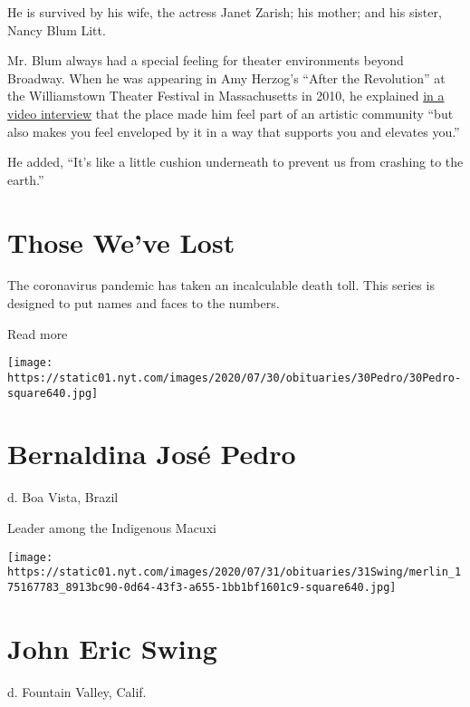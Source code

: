 He is survived by his wife, the actress Janet Zarish; his mother; and
his sister, Nancy Blum Litt.

Mr. Blum always had a special feeling for theater environments beyond
Broadway. When he was appearing in Amy Herzog's ``After the Revolution''
at the Williamstown Theater Festival in Massachusetts in 2010, he
explained \href{https://www.youtube.com/watch?v=tGvwH1mJYDg}{in a video
interview} that the place made him feel part of an artistic community
``but also makes you feel enveloped by it in a way that supports you and
elevates you.''

He added, ``It's like a little cushion underneath to prevent us from
crashing to the earth.''

\href{https://www.nytimes.com/interactive/2020/obituaries/people-died-coronavirus-obituaries.html?action=click\&pgtype=Article\&state=default\&region=BELOW_MAIN_CONTENT\&context=covid_obits_promo}{}

\hypertarget{those-weve-lost}{%
\section{Those We've Lost}\label{those-weve-lost}}

The coronavirus pandemic has taken an incalculable death toll. This
series is designed to put names and faces to the numbers.

Read more

\texttt{[image: https://static01.nyt.com/images/2020/07/30/obituaries/30Pedro/30Pedro-square640.jpg]}

\hypertarget{bernaldina-josuxe9-pedro}{%
\section{Bernaldina José Pedro}\label{bernaldina-josuxe9-pedro}}

d. Boa Vista, Brazil

Leader among the Indigenous Macuxi

\texttt{[image: https://static01.nyt.com/images/2020/07/31/obituaries/31Swing/merlin\_175167783\_8913bc90-0d64-43f3-a655-1bb1bf1601c9-square640.jpg]}

\hypertarget{john-eric-swing}{%
\section{John Eric Swing}\label{john-eric-swing}}

d. Fountain Valley, Calif.

